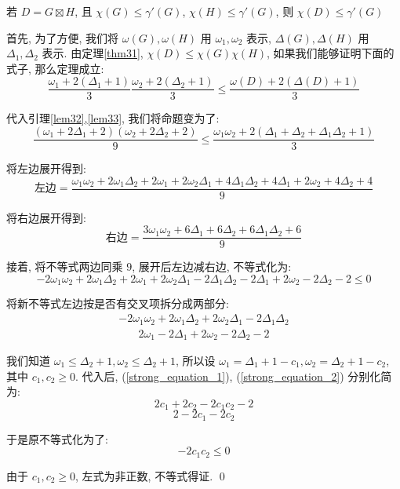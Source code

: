 \documentclass[12pt,a4paper]{article}%
\begin{document}
\begin{thm}
    若 $D = G \boxtimes H$, 且 $\chi(G) \leq \gamma'(G)$, $\chi(H) \leq \gamma'(G)$, 则 $\chi(D) \leq \gamma'(G)$
\end{thm}
\begin{pf}
    首先, 为了方便, 我们将 $\omega(G),\omega(H)$ 用 $\omega_1, \omega_2$ 表示, $\Delta(G), \Delta(H)$ 用 $\Delta_1, \Delta_2$ 表示. 由定理\ref{thm31}, $\chi(D) \leq \chi(G)\chi(H)$, 如果我们能够证明下面的式子, 那么定理成立:
    $$\frac{\omega_1 + 2(\Delta_1 + 1)}{3} \frac{\omega_2 + 2(\Delta_2 + 1)}{3} \leq \frac{\omega(D) + 2(\Delta(D) + 1)}{3}$$

    代入引理\ref{lem32},\ref{lem33}, 我们将命题变为了:
    $$\frac{(\omega_1 + 2\Delta_1 + 2) (\omega_2 + 2\Delta_2 + 2)}{9} \leq \frac{\omega_1\omega_2 + 2(\Delta_1+\Delta_2+\Delta_1\Delta_2 + 1)}{3}$$
    
    将左边展开得到:
    $$\text{左边} = \frac{\omega_1\omega_2 + 2\omega_1\Delta_2 + 2\omega_1 + 2\omega_2\Delta_1 + 4\Delta_1\Delta_2 + 4\Delta_1 + 2\omega_2 + 4\Delta_2 + 4}{9}$$

    将右边展开得到:
    $$\text{右边} = \frac{3\omega_1\omega_2 + 6\Delta_1 + 6\Delta_2 + 6\Delta_1\Delta_2 + 6}{9}$$

    接着, 将不等式两边同乘 $9$, 展开后左边减右边, 不等式化为:
    $$-2\omega_1\omega_2 + 2\omega_1\Delta_2 + 2\omega_1 + 2\omega_2\Delta_1 - 2\Delta_1\Delta_2 -2\Delta_1 + 2\omega_2 - 2\Delta_2 -2 \leq 0$$

    将新不等式左边按是否有交叉项拆分成两部分:
    \begin{equation}
    \begin{aligned}
        -2\omega_1\omega_2 + 2\omega_1\Delta_2 + 2\omega_2\Delta_1 - 2\Delta_1\Delta_2
    \end{aligned}
    \label{strong_equation_1}
    \end{equation}
    \begin{equation}
    \begin{aligned}
        2\omega_1 -2\Delta_1 + 2\omega_2 - 2\Delta_2 -2
    \end{aligned}
    \label{strong_equation_2}
    \end{equation}
    
    我们知道 $\omega_1 \leq \Delta_2 + 1, \omega_2 \leq \Delta_2 + 1$, 所以设 $\omega_1 = \Delta_1 + 1 - c_1, \omega_2 = \Delta_2 + 1 - c_2$, 其中 $c_1, c_2 \geq 0$. 代入后, (\ref{strong_equation_1}), (\ref{strong_equation_2}) 分别化简为:
    $$2c_1 + 2c_2 - 2c_1c_2 -2$$
    $$2 - 2c_1 - 2c_2$$

    于是原不等式化为了:
    $$-2c_1c_2 \leq 0$$

    由于 $c_1, c_2 \geq 0$, 左式为非正数, 不等式得证. \qed

\end{pf}
\end{document}
